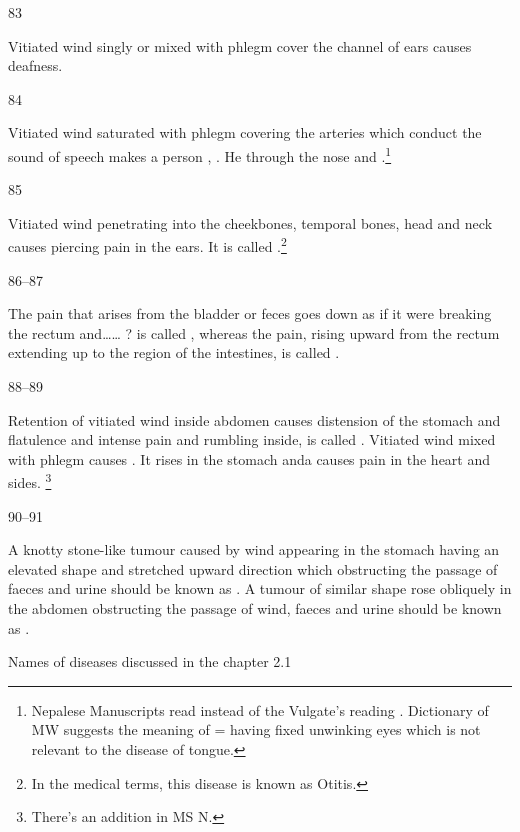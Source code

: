 \begin{translation}
\item[83]

	Vitiated wind singly or mixed with phlegm cover the channel of ears
	causes deafness.

\item[84]

	Vitiated wind saturated with phlegm covering the arteries which conduct
	the sound of speech makes a person ,
	. He  through the nose and
	.\footnote{Nepalese Manuscripts read 
	instead of the Vulgate’s reading . Dictionary of MW suggests
	the meaning of  = having fixed unwinking eyes which is not
	relevant to the disease of tongue.}

\item[85]

	Vitiated wind penetrating into the cheekbones, temporal bones, head and
	neck causes piercing pain in the ears. It is called
	.\footnote{In the medical terms, this disease is
	known as Otitis.}

\item[86--87]

	The pain that arises from the bladder or feces goes down as if it were
	breaking the rectum and…… ? is called , whereas the pain,
	rising upward from the rectum extending up to the region of the
	intestines, is called .

\item[88--89]

	Retention of vitiated wind inside abdomen causes distension of the
	stomach and flatulence and intense pain and rumbling inside, is called
	. Vitiated wind mixed with phlegm causes
	. It rises in the stomach anda causes pain in the heart
	and sides. \footnote{There’s an addition in MS N. }

\item[90--91]

	A knotty stone-like tumour caused by wind appearing in the stomach
	having an elevated shape and stretched upward direction which
	obstructing the passage of faeces and urine should be known as
	. A tumour of similar shape rose obliquely in the abdomen
	obstructing the passage of wind, faeces and urine should be known as
	. 


	Names of diseases discussed in the chapter 2.1

	   
	 
	 
	   
	  




\end{translation}
